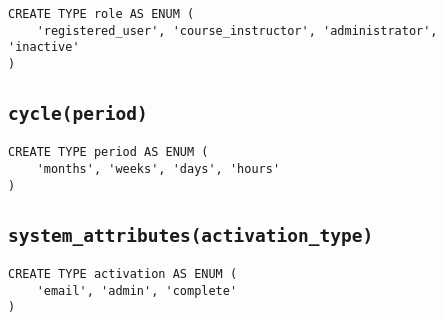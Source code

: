 \begin{verbatim}
CREATE TYPE role AS ENUM (
    'registered_user', 'course_instructor', 'administrator', 'inactive'
)
\end{verbatim}

\subsection{\texttt{cycle(period)}}

\begin{verbatim}
CREATE TYPE period AS ENUM (
    'months', 'weeks', 'days', 'hours'
)
\end{verbatim}

\subsection{\texttt{system\_attributes(activation\_type)}}

\begin{verbatim}
CREATE TYPE activation AS ENUM (
    'email', 'admin', 'complete'
)
\end{verbatim}
